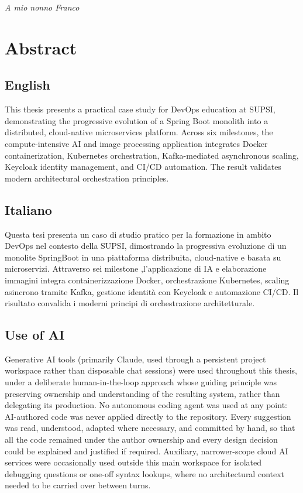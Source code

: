 \documentclass[twoside]{supsistudent}
\begin{document}
\maketitle
\onehalfspacing
\frontmatter

\cleardoublepage
\vspace*{0.2\textheight}
\begin{flushright}
\textit{A mio nonno Franco}
\end{flushright}
\vfill
\cleardoublepage

\chapter{Abstract}
\section{English}
This thesis presents a practical case study for DevOps education at SUPSI, demonstrating the progressive evolution of a Spring Boot monolith into a distributed, cloud-native microservices platform. Across six milestones, the compute-intensive AI and image processing application integrates Docker containerization, Kubernetes orchestration, Kafka-mediated asynchronous scaling, Keycloak identity management, and CI/CD automation. The result validates modern architectural orchestration principles.  
\section{Italiano}
Questa tesi presenta un caso di studio pratico per la formazione in ambito DevOps nel contesto della SUPSI, dimostrando la progressiva evoluzione di un monolite SpringBoot in una piattaforma distribuita, cloud-native e basata su microservizi. Attraverso sei milestone ,l'applicazione di IA e elaborazione immagini integra containerizzazione Docker, orchestrazione Kubernetes, scaling asincrono tramite Kafka, gestione identità con Keycloak e automazione CI/CD. Il risultato convalida i moderni principi di orchestrazione architetturale.

\section{Use of AI}
Generative AI tools (primarily Claude, used through a persistent project workspace rather than disposable chat sessions) were used throughout this thesis, under a deliberate human-in-the-loop approach whose guiding principle was preserving ownership and understanding of the resulting system, rather than delegating its production. No autonomous coding agent was used at any point: AI-authored code was never applied directly to the repository. Every suggestion was read, understood, adapted where necessary, and committed by hand, so that all the code remained under the author ownership and every design decision could be explained and justified if required. Auxiliary, narrower-scope cloud AI services were occasionally used outside this main workspace for isolated debugging questions or one-off syntax lookups, where no architectural context needed to be carried over between turns.
\end{document}

